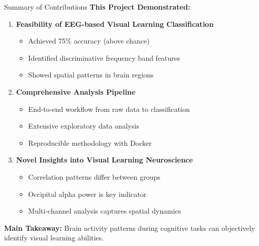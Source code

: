 \documentclass[aspectratio=169]{beamer}
\begin{document}
\begin{frame}{Summary of Contributions}
\textbf{This Project Demonstrated:}

\begin{enumerate}
    \item \textbf{Feasibility of EEG-based Visual Learning Classification}
    \begin{itemize}
        \item Achieved 75\% accuracy (above chance)
        \item Identified discriminative frequency band features
        \item Showed spatial patterns in brain regions
    \end{itemize}
    
    \vspace{3mm}
    
    \item \textbf{Comprehensive Analysis Pipeline}
    \begin{itemize}
        \item End-to-end workflow from raw data to classification
        \item Extensive exploratory data analysis
        \item Reproducible methodology with Docker
    \end{itemize}
    
    \vspace{3mm}
    
    \item \textbf{Novel Insights into Visual Learning Neuroscience}
    \begin{itemize}
        \item Correlation patterns differ between groups
        \item Occipital alpha power is key indicator
        \item Multi-channel analysis captures spatial dynamics
    \end{itemize}
\end{enumerate}

\vspace{3mm}

\begin{center}
\colorbox{deepblue!20}{\parbox{0.9\textwidth}{\centering
\textbf{Main Takeaway:} Brain activity patterns during cognitive tasks can objectively identify visual learning abilities.
}}
\end{center}
\end{frame}
\end{document}
